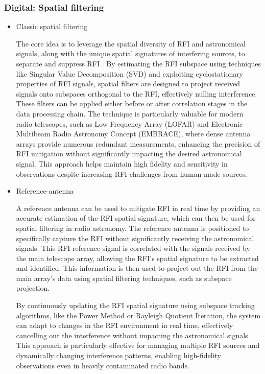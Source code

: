 \subsubsection{Digital: Spatial filtering}
\begin{itemize}
\item Classic spatial filtering

The core idea is to leverage the spatial diversity of RFI and astronomical signals, along with the unique spatial signatures of interfering sources, to separate and suppress RFI \citep{hellbourg2014radio,hellbourg2016spatial,hellbourg2014rfi}. By estimating the RFI subspace using techniques like Singular Value Decomposition (SVD) and exploiting cyclostationary properties of RFI signals, spatial filters are designed to project received signals onto subspaces orthogonal to the RFI, effectively nulling interference. These filters can be applied either before or after correlation stages in the data processing chain. The technique is particularly valuable for modern radio telescopes, such as Low Frequency Array (LOFAR) and Electronic Multibeam Radio Astronomy Concept (EMBRACE), where dense antenna arrays provide numerous redundant measurements, enhancing the precision of RFI mitigation without significantly impacting the desired astronomical signal. This approach helps maintain high fidelity and sensitivity in observations despite increasing RFI challenges from human-made sources.

\item Reference-antenna

A reference antenna can be used to mitigate RFI in real time by providing an accurate estimation of the RFI spatial signature, which can then be used for spatial filtering in radio astronomy. The reference antenna is positioned to specifically capture the RFI without significantly receiving the astronomical signals. This RFI reference signal is correlated with the signals received by the main telescope array, allowing the RFI's spatial signature to be extracted and identified. This information is then used to project out the RFI from the main array's data using spatial filtering techniques, such as subspace projection.

By continuously updating the RFI spatial signature using subspace tracking algorithms, like the Power Method or Rayleigh Quotient Iteration, the system can adapt to changes in the RFI environment in real time, effectively cancelling out the interference without impacting the astronomical signals. This approach is particularly effective for managing multiple RFI sources and dynamically changing interference patterns, enabling high-fidelity observations even in heavily contaminated radio bands\citep{hellbourg2014reference,sardarabadi2015spatial}.

\end{itemize}
